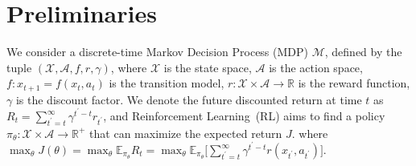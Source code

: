 \documentclass{article} %
\begin{document}











    



\section{Preliminaries}
We consider a discrete-time Markov Decision Process (MDP) $\mathcal{M}$, defined by the tuple $\left(\mathcal{X}, \mathcal{A}, f, r, \gamma \right)$, where $\mathcal{X}$ is the state space, $\mathcal{A}$ is the action space, $f:x_{t+1}=f(x_t, a_t)$ is the transition model,  $r:\mathcal{X}\times\mathcal{A}\rightarrow \mathbb{R}$ is the reward function, $\gamma$ is the discount factor. We denote the future discounted return at time $t$ as $R_t=\sum_{t^\prime =t}^{\infty} \gamma^{t^\prime -t}r_{t^\prime}$, and Reinforcement Learning~(RL) aims to find a policy $\pi_\theta:\mathcal{X}\times\mathcal{A}\rightarrow \mathbb{R}^+$ that can maximize the expected return $J$. 
where $\max_{\theta} J(\theta) = \max_{\theta} \mathbb{E}_{\pi_\theta} R_t =  \max_{\theta} \mathbb{E}_{\pi_\theta} \Big[ \sum_{t^\prime =t}^{\infty} \gamma^{t^\prime -t} r(x_{t^\prime}, a_{t^\prime})\Big]$.
\end{document}
